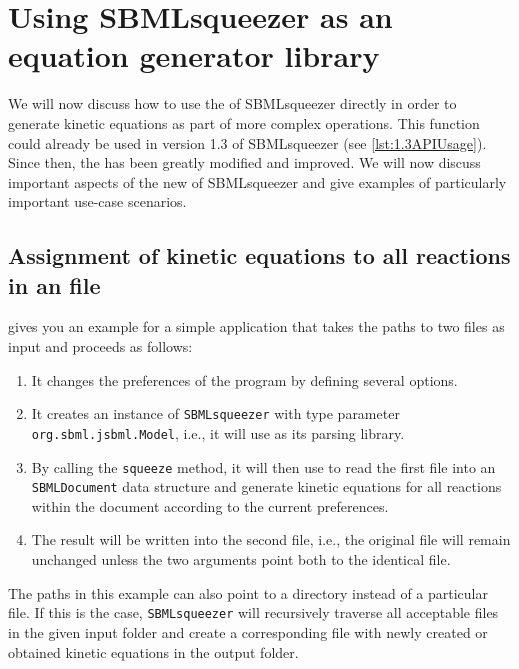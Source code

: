 \section{Using SBMLsqueezer as an equation generator library}
\label{sec:API}

We will now discuss how to use the \API of SBMLsqueezer directly in order to generate kinetic equations as part of more complex operations.
This function could already be used in version 1.3 of SBMLsqueezer (see \cref{lst:1.3APIUsage}).
Since then, the \API has been greatly modified and improved.
We will now discuss important aspects of the new \API of SBMLsqueezer and give examples of particularly important use-case scenarios.

\subsection{Assignment of kinetic equations to all reactions in an \SBML file}

 gives you an example for a simple application that takes the paths to two \SBML files as input and proceeds as follows:
\begin{enumerate}
  \item It changes the preferences of the program by defining several options.
  \item It creates an instance of \texttt{SBMLsqueezer} with type parameter \texttt{org.sbml.jsbml.Model}, i.e., it will use \JSBML as its parsing library.
  \item By calling the \texttt{squeeze} method, it will then use \JSBML to read the first file into an \texttt{SBMLDocument} data structure and generate kinetic equations for all reactions within the document according to the current preferences.
  \item The result will be written into the second file, i.e., the original file will remain unchanged unless the two arguments point both to the identical file.
\end{enumerate}
The paths in this example can also point to a directory instead of a particular file.
If this is the case, \texttt{SBMLsqueezer} will recursively traverse all acceptable \SBML files in the given input folder and create a corresponding file with newly created or obtained kinetic equations in the output folder.


